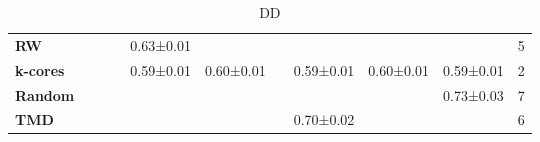 \begin{table}[H]
\begin{subtable}{\textwidth}
{\begin{tabular}{l|c|c|c|c|c|c|c|c|c|c}
\hline
\textbf{RW}
    & \cellcolor{green!25}{0.58±0.01}
    & \cellcolor{green!80}{0.59±0.01}
    & \cellcolor{green!80}{0.61±0.01}
    & 0.63±0.01
    & \cellcolor{green!80}{0.66±0.02}
    & \cellcolor{green!80}{0.69±0.01}
    & \cellcolor{green!80}{0.72±0.02}
    & \cellcolor{green!25}{0.73±0.02}
    & \cellcolor{green!25}{0.74±0.02}
    & 5 \\
\textbf{k-cores}
    & \cellcolor{green!80}{0.59±0.01}
    & \cellcolor{green!80}{0.59±0.01}
    & \cellcolor{green!25}{0.59±0.02}
    & 0.59±0.01
    & 0.60±0.01
    & \cellcolor{green!25}{0.59±0.01}
    & 0.59±0.01
    & 0.60±0.01
    & 0.59±0.01
    & 2 \\
\textbf{Random}
    & \cellcolor{green!80}{0.59±0.01}
    & \cellcolor{green!25}{0.58±0.01}
    & \cellcolor{green!80}{0.61±0.01}
    & \cellcolor{green!25}{0.64±0.01}
    & \cellcolor{green!80}{0.66±0.02}
    & \cellcolor{green!80}{0.69±0.02}
    & \cellcolor{green!25}{0.71±0.02}
    & \cellcolor{green!25}{0.73±0.02}
    & 0.73±0.03
    & 7 \\
\textbf{TMD}
    & \cellcolor{green!25}{0.58±0.02}
    & \cellcolor{green!80}{0.59±0.01}
    & \cellcolor{green!80}{0.61±0.01}
    & \cellcolor{green!80}{0.65±0.02}
    & \cellcolor{green!25}{0.65±0.02}
    & \cellcolor{green!80}{0.69±0.02}
    & 0.70±0.02
    & \cellcolor{green!80}{0.74±0.01}
    & \cellcolor{green!80}{0.76±0.01}
    & 6 \\
\hline
\end{tabular}
}
\caption{DD}
\label{tab:dd-pivot}
\end{subtable}

\vspace{0em}


\begin{subtable}{\textwidth}
\centering
{}
\end{subtable}
\end{table}
